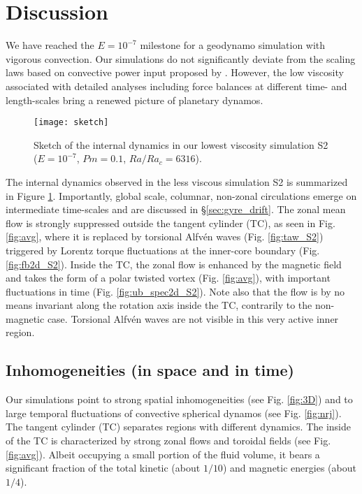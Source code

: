 \documentclass[12pt, a4paper]{article}
\begin{document}
\section{Discussion}

We have reached the $E=10^{-7}$ milestone for a geodynamo simulation with vigorous convection.
Our simulations do not significantly deviate from the scaling laws based on convective power input proposed by \citet{christensen2006}.
However, the low viscosity associated with detailed analyses including force balances at different time- and length-scales bring a renewed picture of planetary dynamos.

\begin{figure}
\begin{center}
\texttt{[image: sketch]}
\caption{Sketch of the internal dynamics in our lowest viscosity simulation S2 ($E=10^{-7}$, $Pm=0.1$, $Ra/Ra_c=6316$).}
\label{fig:sketch}
\end{center}
\end{figure}

The internal dynamics observed in the less viscous simulation S2 is summarized in Figure \ref{fig:sketch}.
Importantly, global scale, columnar, non-zonal circulations emerge on intermediate time-scales and are discussed in \S\ref{sec:gyre_drift}.
The zonal mean flow is strongly suppressed outside the tangent cylinder (TC), as seen in Fig. \ref{fig:avg}, where it is replaced by torsional Alfvén waves (Fig. \ref{fig:taw_S2}) triggered by Lorentz torque fluctuations at the inner-core boundary (Fig. \ref{fig:fb2d_S2}).
Inside the TC, the zonal flow is enhanced by the magnetic field and takes the form of a polar twisted vortex (Fig. \ref{fig:avg}), with important fluctuations in time (Fig. \ref{fig:ub_spec2d_S2}).
Note also that the flow is by no means invariant along the rotation axis inside the TC, contrarily to the non-magnetic case.
Torsional Alfvén waves are not visible in this very active inner region.

\subsection{Inhomogeneities (in space and in time)}

Our simulations point to strong spatial inhomogeneities (see Fig. \ref{fig:3D}) and to large temporal fluctuations of convective spherical dynamos  (see Fig. \ref{fig:nrj}).
The tangent cylinder (TC) separates regions with different dynamics. The inside of the TC is characterized by strong zonal flows and toroidal fields (see Fig. \ref{fig:avg}).
Albeit occupying a small portion of the fluid volume, it bears a significant fraction of the total kinetic (about $1/10$) and magnetic energies (about $1/4$).
\end{document}
